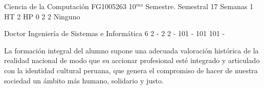 \documentclass[a4paper,8pt]{article}
\begin{document}
\setNombreProfesor{}
\setGradoProfesorAbreviado{}
\sylabusHeader

\academicaTable
{Ciencia de la Computación} %
{FG1005263} %
{10$^{mo}$ Semestre.} %
{Semestral} %
{17 Semanas} %
{1 HT} %
{2 HP} %
{0} %
{}  %
{2} %
{2} %
{Ninguno} %

\administrativaTable
{Doctor} %
{Ingeniería de Sistemas e Informática} %
{6} %
{2} %
{-} %
{2} %
{2} %
{-} %
{101} %
{-} %
{101} %
{101} %
{-} %


\begin{fundamentacion}
La formación integral del alumno supone una adecuada valoración histórica de la realidad nacional de modo que su accionar profesional esté integrado y articulado con la identidad cultural peruana, que genera el compromiso de hacer de nuestra sociedad un ámbito más humano, solidario y justo.

\end{fundamentacion}

\begin{sumilla}
\item 
\item 
\item 
\item 

\end{sumilla}

\begin{competenciasAsignatura}
\item {}

\end{competenciasAsignatura}
\end{document}
